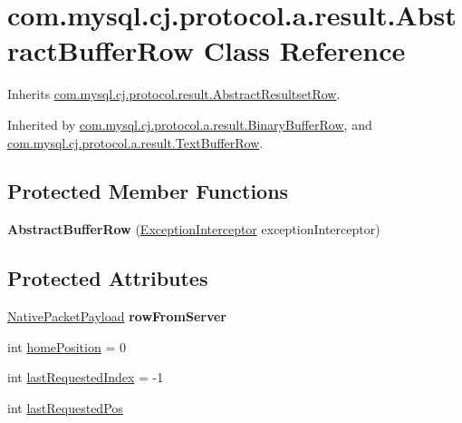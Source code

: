\hypertarget{classcom_1_1mysql_1_1cj_1_1protocol_1_1a_1_1result_1_1_abstract_buffer_row}{}\section{com.\+mysql.\+cj.\+protocol.\+a.\+result.\+Abstract\+Buffer\+Row Class Reference}
\label{classcom_1_1mysql_1_1cj_1_1protocol_1_1a_1_1result_1_1_abstract_buffer_row}


Inherits \mbox{\hyperlink{classcom_1_1mysql_1_1cj_1_1protocol_1_1result_1_1_abstract_resultset_row}{com.\+mysql.\+cj.\+protocol.\+result.\+Abstract\+Resultset\+Row}}.



Inherited by \mbox{\hyperlink{classcom_1_1mysql_1_1cj_1_1protocol_1_1a_1_1result_1_1_binary_buffer_row}{com.\+mysql.\+cj.\+protocol.\+a.\+result.\+Binary\+Buffer\+Row}}, and \mbox{\hyperlink{classcom_1_1mysql_1_1cj_1_1protocol_1_1a_1_1result_1_1_text_buffer_row}{com.\+mysql.\+cj.\+protocol.\+a.\+result.\+Text\+Buffer\+Row}}.

\subsection*{Protected Member Functions}
\begin{DoxyCompactItemize}
\item 
\mbox{\label{classcom_1_1mysql_1_1cj_1_1protocol_1_1a_1_1result_1_1_abstract_buffer_row_a08349d40ae79d6ead1baec4a471ee3f0}} 
{\bfseries Abstract\+Buffer\+Row} (\mbox{\hyperlink{interfacecom_1_1mysql_1_1cj_1_1exceptions_1_1_exception_interceptor}{Exception\+Interceptor}} exception\+Interceptor)
\end{DoxyCompactItemize}
\subsection*{Protected Attributes}
\begin{DoxyCompactItemize}
\item 
\mbox{\label{classcom_1_1mysql_1_1cj_1_1protocol_1_1a_1_1result_1_1_abstract_buffer_row_a7cf03826ff7d879810ca7d23472a49f5}} 
\mbox{\hyperlink{classcom_1_1mysql_1_1cj_1_1protocol_1_1a_1_1_native_packet_payload}{Native\+Packet\+Payload}} {\bfseries row\+From\+Server}
\item 
int \mbox{\hyperlink{classcom_1_1mysql_1_1cj_1_1protocol_1_1a_1_1result_1_1_abstract_buffer_row_a38cbe12c531c96a8ba04b80fee493a5b}{home\+Position}} = 0
\item 
int \mbox{\hyperlink{classcom_1_1mysql_1_1cj_1_1protocol_1_1a_1_1result_1_1_abstract_buffer_row_a3ac289decb8f1f479611dafef6e45086}{last\+Requested\+Index}} = -\/1
\item 
int \mbox{\hyperlink{classcom_1_1mysql_1_1cj_1_1protocol_1_1a_1_1result_1_1_abstract_buffer_row_a3a7cb8406241de42bddb1ea0db5f0808}{last\+Requested\+Pos}}
\end{DoxyCompactItemize}
